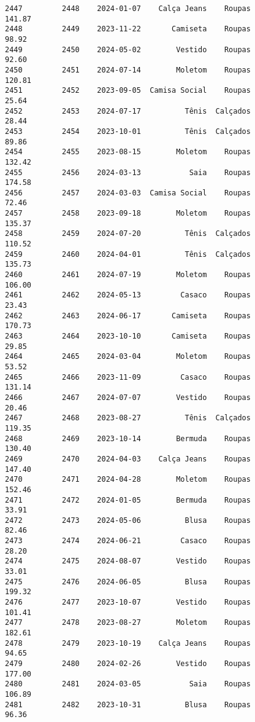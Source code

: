 \documentclass[11pt]{article}
\begin{document}
\begin{Verbatim}[commandchars=\\\{\}]
2447         2448    2024-01-07    Calça Jeans    Roupas          141.87   
2448         2449    2023-11-22       Camiseta    Roupas           98.92   
2449         2450    2024-05-02        Vestido    Roupas           92.60   
2450         2451    2024-07-14        Moletom    Roupas          120.81   
2451         2452    2023-09-05  Camisa Social    Roupas           25.64   
2452         2453    2024-07-17          Tênis  Calçados           28.44   
2453         2454    2023-10-01          Tênis  Calçados           89.86   
2454         2455    2023-08-15        Moletom    Roupas          132.42   
2455         2456    2024-03-13           Saia    Roupas          174.58   
2456         2457    2024-03-03  Camisa Social    Roupas           72.46   
2457         2458    2023-09-18        Moletom    Roupas          135.37   
2458         2459    2024-07-20          Tênis  Calçados          110.52   
2459         2460    2024-04-01          Tênis  Calçados          135.73   
2460         2461    2024-07-19        Moletom    Roupas          106.00   
2461         2462    2024-05-13         Casaco    Roupas           23.43   
2462         2463    2024-06-17       Camiseta    Roupas          170.73   
2463         2464    2023-10-10       Camiseta    Roupas           29.85   
2464         2465    2024-03-04        Moletom    Roupas           53.52   
2465         2466    2023-11-09         Casaco    Roupas          131.14   
2466         2467    2024-07-07        Vestido    Roupas           20.46   
2467         2468    2023-08-27          Tênis  Calçados          119.35   
2468         2469    2023-10-14        Bermuda    Roupas          130.40   
2469         2470    2024-04-03    Calça Jeans    Roupas          147.40   
2470         2471    2024-04-28        Moletom    Roupas          152.46   
2471         2472    2024-01-05        Bermuda    Roupas           33.91   
2472         2473    2024-05-06          Blusa    Roupas           82.46   
2473         2474    2024-06-21         Casaco    Roupas           28.20   
2474         2475    2024-08-07        Vestido    Roupas           33.01   
2475         2476    2024-06-05          Blusa    Roupas          199.32   
2476         2477    2023-10-07        Vestido    Roupas          101.41   
2477         2478    2023-08-27        Moletom    Roupas          182.61   
2478         2479    2023-10-19    Calça Jeans    Roupas           94.65   
2479         2480    2024-02-26        Vestido    Roupas          177.00   
2480         2481    2024-03-05           Saia    Roupas          106.89   
2481         2482    2023-10-31          Blusa    Roupas           96.36   

\end{Verbatim}
\end{document}
